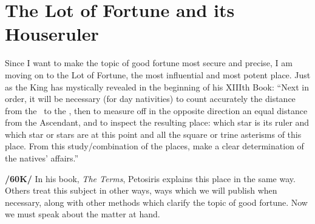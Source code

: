 \section{The Lot of Fortune and its Houseruler}
 
Since I want to make the topic of good fortune most secure and precise, I am moving on to the Lot of Fortune, the most influential and most potent place. Just as the King has mystically revealed in the beginning of his XIIIth Book: \mnt “Next in order, it will be necessary (for day nativities) to count accurately the distance from the \Sun\, to the \Moon, then to measure off in the opposite direction an equal distance from
the Ascendant, and to inspect the resulting place: which star is its ruler and which star or stars are at this point and all the square or trine asterisms of this place. From this study/combination of the places, make a clear determination of the natives’ affairs.”

\textbf{/60K/} In his book, \textit{The Terms}, Petosiris explains this place in the same way. Others treat this subject
in other ways, ways which we will publish when necessary, along with other methods which clarify the topic of good fortune. Now we must speak about the matter at hand.

\newpage